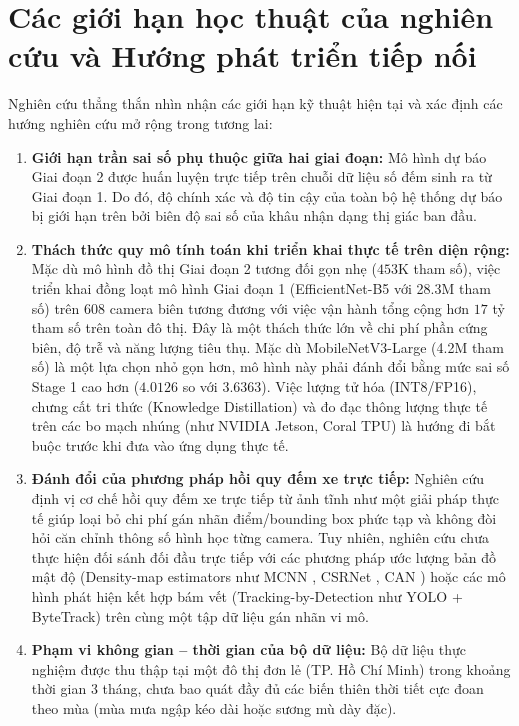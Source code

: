 \section{Các giới hạn học thuật của nghiên cứu và Hướng phát triển tiếp nối}
\label{sec:han_che_va_huong_phat_trien}

Nghiên cứu thẳng thắn nhìn nhận các giới hạn kỹ thuật hiện tại và xác định các hướng nghiên cứu mở rộng trong tương lai:

\begin{enumerate}
    \item \textbf{Giới hạn trần sai số phụ thuộc giữa hai giai đoạn:} Mô hình dự báo Giai đoạn 2 được huấn luyện trực tiếp trên chuỗi dữ liệu số đếm sinh ra từ Giai đoạn 1. Do đó, độ chính xác và độ tin cậy của toàn bộ hệ thống dự báo bị giới hạn trên bởi biên độ sai số của khâu nhận dạng thị giác ban đầu.
    \item \textbf{Thách thức quy mô tính toán khi triển khai thực tế trên diện rộng:} Mặc dù mô hình đồ thị Giai đoạn 2 tương đối gọn nhẹ ($453\text{K}$ tham số), việc triển khai đồng loạt mô hình Giai đoạn 1 (EfficientNet-B5 với 28.3M tham số) trên 608 camera biên tương đương với việc vận hành tổng cộng hơn $17$ tỷ tham số trên toàn đô thị. Đây là một thách thức lớn về chi phí phần cứng biên, độ trễ và năng lượng tiêu thụ. Mặc dù MobileNetV3-Large (4.2M tham số) là một lựa chọn nhỏ gọn hơn, mô hình này phải đánh đổi bằng mức sai số Stage 1 cao hơn ($4.0126$ so với $3.6363$). Việc lượng tử hóa (INT8/FP16), chưng cất tri thức (Knowledge Distillation) và đo đạc thông lượng thực tế trên các bo mạch nhúng (như NVIDIA Jetson, Coral TPU) là hướng đi bắt buộc trước khi đưa vào ứng dụng thực tế.
    \item \textbf{Đánh đổi của phương pháp hồi quy đếm xe trực tiếp:} Nghiên cứu định vị cơ chế hồi quy đếm xe trực tiếp từ ảnh tĩnh như một giải pháp thực tế giúp loại bỏ chi phí gán nhãn điểm/bounding box phức tạp và không đòi hỏi căn chỉnh thông số hình học từng camera. Tuy nhiên, nghiên cứu chưa thực hiện đối sánh đối đầu trực tiếp với các phương pháp ước lượng bản đồ mật độ (Density-map estimators như MCNN \cite{mcnn}, CSRNet \cite{csrnet}, CAN \cite{can}) hoặc các mô hình phát hiện kết hợp bám vết (Tracking-by-Detection như YOLO \cite{yolo} + ByteTrack) trên cùng một tập dữ liệu gán nhãn vi mô.
    \item \textbf{Phạm vi không gian -- thời gian của bộ dữ liệu:} Bộ dữ liệu thực nghiệm được thu thập tại một đô thị đơn lẻ (TP. Hồ Chí Minh) trong khoảng thời gian 3 tháng, chưa bao quát đầy đủ các biến thiên thời tiết cực đoan theo mùa (mùa mưa ngập kéo dài hoặc sương mù dày đặc).

\end{enumerate}
